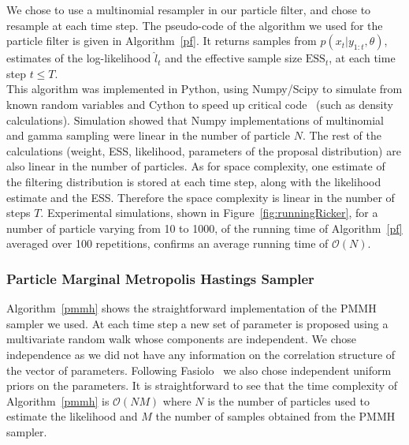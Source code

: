 \documentclass[12pt]{article}
\begin{document}
	We chose to use a multinomial resampler in our particle filter, and chose to resample at each time step. The pseudo-code of the algorithm we used for the particle filter is given in Algorithm~\ref{pf}. It returns samples from $p(x_t | y_{1:t}, \theta)$, estimates of the log-likelihood $\hat{l}_t$ and the effective sample size $\mathrm{ESS}_t$, at each time step $t \le T$. \\
	This algorithm was implemented in Python, using Numpy/Scipy to simulate from known random variables and Cython to speed up critical code~\cite{wilbers2009using, behnel2011cython} (such as density calculations). Simulation showed that Numpy implementations of multinomial and gamma sampling were linear in the number of particle $N$. The rest of the calculations (weight, ESS, likelihood, parameters of the proposal distribution) are also linear in the number of particles. As for space complexity, one estimate of the filtering distribution is stored at each time step, along with the likelihood estimate and the ESS. Therefore the space complexity is linear in the number of steps $T$. Experimental simulations, shown in Figure~\ref{fig:runningRicker}, for a number of particle varying from 10 to 1000, of the running time of Algorithm~\ref{pf} averaged over 100 repetitions, confirms an average running time of $\mathcal{O}(N)$.
	
	\subsubsection{Particle Marginal Metropolis Hastings Sampler}
	Algorithm~\ref{pmmh} shows the straightforward implementation of the PMMH sampler we used. At each time step a new set of parameter is proposed using a multivariate random walk whose components are independent. We chose independence as we did not have any information on the correlation structure of the vector of parameters. Following Fasiolo~\cite{fasiolo2014statistical} we also chose independent uniform priors on the parameters. It is straightforward to see that the time complexity of Algorithm~\ref{pmmh} is $\mathcal{O}(NM)$ where $N$ is the number of particles used to estimate the likelihood and $M$ the number of samples obtained from the PMMH sampler.
	
\end{document}
